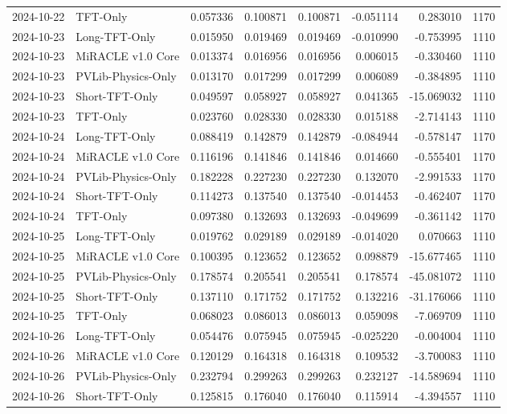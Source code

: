 \begin{tabular}{llrrrrrr}
2024-10-22 & TFT-Only & 0.057336 & 0.100871 & 0.100871 & -0.051114 & 0.283010 & 1170 \\
2024-10-23 & Long-TFT-Only & 0.015950 & 0.019469 & 0.019469 & -0.010990 & -0.753995 & 1110 \\
2024-10-23 & MiRACLE v1.0 Core & 0.013374 & 0.016956 & 0.016956 & 0.006015 & -0.330460 & 1110 \\
2024-10-23 & PVLib-Physics-Only & 0.013170 & 0.017299 & 0.017299 & 0.006089 & -0.384895 & 1110 \\
2024-10-23 & Short-TFT-Only & 0.049597 & 0.058927 & 0.058927 & 0.041365 & -15.069032 & 1110 \\
2024-10-23 & TFT-Only & 0.023760 & 0.028330 & 0.028330 & 0.015188 & -2.714143 & 1110 \\
2024-10-24 & Long-TFT-Only & 0.088419 & 0.142879 & 0.142879 & -0.084944 & -0.578147 & 1170 \\
2024-10-24 & MiRACLE v1.0 Core & 0.116196 & 0.141846 & 0.141846 & 0.014660 & -0.555401 & 1170 \\
2024-10-24 & PVLib-Physics-Only & 0.182228 & 0.227230 & 0.227230 & 0.132070 & -2.991533 & 1170 \\
2024-10-24 & Short-TFT-Only & 0.114273 & 0.137540 & 0.137540 & -0.014453 & -0.462407 & 1170 \\
2024-10-24 & TFT-Only & 0.097380 & 0.132693 & 0.132693 & -0.049699 & -0.361142 & 1170 \\
2024-10-25 & Long-TFT-Only & 0.019762 & 0.029189 & 0.029189 & -0.014020 & 0.070663 & 1110 \\
2024-10-25 & MiRACLE v1.0 Core & 0.100395 & 0.123652 & 0.123652 & 0.098879 & -15.677465 & 1110 \\
2024-10-25 & PVLib-Physics-Only & 0.178574 & 0.205541 & 0.205541 & 0.178574 & -45.081072 & 1110 \\
2024-10-25 & Short-TFT-Only & 0.137110 & 0.171752 & 0.171752 & 0.132216 & -31.176066 & 1110 \\
2024-10-25 & TFT-Only & 0.068023 & 0.086013 & 0.086013 & 0.059098 & -7.069709 & 1110 \\
2024-10-26 & Long-TFT-Only & 0.054476 & 0.075945 & 0.075945 & -0.025220 & -0.004004 & 1110 \\
2024-10-26 & MiRACLE v1.0 Core & 0.120129 & 0.164318 & 0.164318 & 0.109532 & -3.700083 & 1110 \\
2024-10-26 & PVLib-Physics-Only & 0.232794 & 0.299263 & 0.299263 & 0.232127 & -14.589694 & 1110 \\
2024-10-26 & Short-TFT-Only & 0.125815 & 0.176040 & 0.176040 & 0.115914 & -4.394557 & 1110 \\

\end{tabular}

